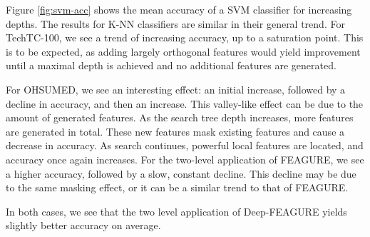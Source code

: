 \documentclass[twoside,11pt]{article}
\theoremstyle{definition}
\begin{document}
Figure \ref{fig:svm-acc} shows the mean accuracy of a SVM classifier for increasing depths. The results for K-NN classifiers are similar in their general trend. For TechTC-100, we see a trend of increasing accuracy, up to a saturation point. This is to be expected, as adding largely orthogonal features would yield improvement until a maximal depth is achieved and no additional features are generated.

For OHSUMED, we see an interesting effect: an initial increase, followed by a decline in accuracy, and then an increase. This valley-like effect can be due to the amount of generated features. As the search tree depth increases, more features are generated in total. These new features mask existing features and cause a decrease in accuracy. As search continues, powerful local features are located, and accuracy once again increases.
For the two-level application of FEAGURE, we see a higher accuracy, followed by a slow, constant decline. This decline may be due to the same masking effect, or it can be a similar trend to that of FEAGURE.

In both cases, we see that the two level application of Deep-FEAGURE yields slightly better accuracy on average.



\end{document}
